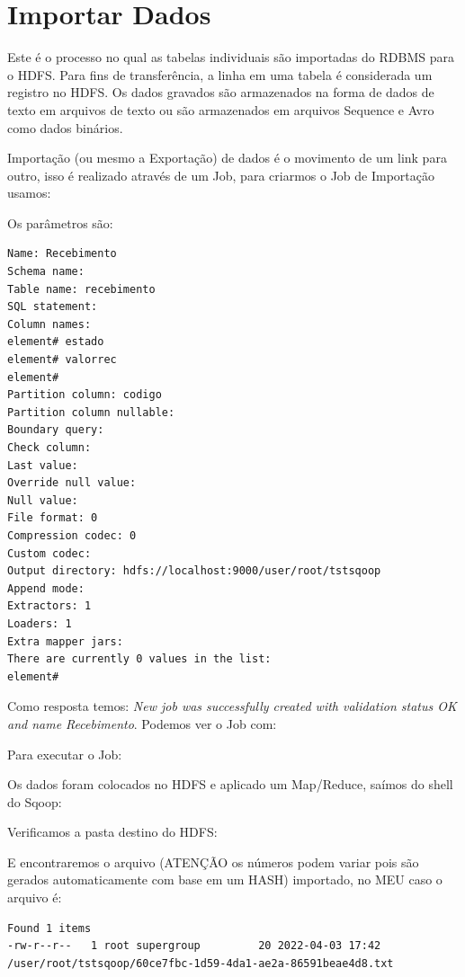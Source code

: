\documentclass[a4paper,11pt]{article}
\begin{document}
\section{Importar Dados}
Este é o processo no qual as tabelas individuais são importadas do RDBMS para o HDFS. Para fins de transferência, a linha em uma tabela é considerada um registro no HDFS. Os dados gravados são armazenados na forma de dados de texto em arquivos de texto ou são armazenados em arquivos Sequence e Avro como dados binários.

Importação (ou mesmo a Exportação) de dados é o movimento de um link para outro, isso é realizado através de um Job, para criarmos o Job de Importação usamos: \\

Os parâmetros são:
\begin{lstlisting}[]
Name: Recebimento
Schema name:
Table name: recebimento
SQL statement:
Column names:
element# estado
element# valorrec
element#
Partition column: codigo
Partition column nullable:
Boundary query:
Check column:
Last value:
Override null value:
Null value:
File format: 0
Compression codec: 0
Custom codec:
Output directory: hdfs://localhost:9000/user/root/tstsqoop
Append mode:
Extractors: 1
Loaders: 1
Extra mapper jars:
There are currently 0 values in the list:
element#
\end{lstlisting}

Como resposta temos: \textit{New job was successfully created with validation status OK and name Recebimento}. Podemos ver o Job com: \\

Para executar o Job: \\

Os dados foram colocados no HDFS e aplicado um Map/Reduce, saímos do shell do Sqoop: \\

Verificamos a pasta destino do HDFS: \\

E encontraremos o arquivo (ATENÇÃO os números podem variar pois são gerados automaticamente com base em um HASH) importado, no MEU caso o arquivo é:
\begin{lstlisting}[]
Found 1 items
-rw-r--r--   1 root supergroup         20 2022-04-03 17:42 /user/root/tstsqoop/60ce7fbc-1d59-4da1-ae2a-86591beae4d8.txt
\end{lstlisting}
\end{document}
